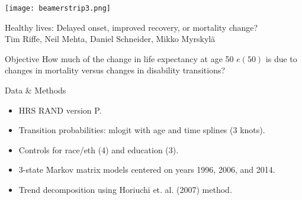 \documentclass[20pt,usenames,dvipsnames]{beamer}
\begin{document}

\begin{frame}[plain]
	\vspace{-3cm}
 \centerline{\texttt{[image: beamerstrip3.png]}}
	\huge
	\vspace{1em}
	
	Healthy lives: Delayed onset, improved recovery, or mortality
change?\\
	\vspace{1em}
	\large 
	Tim Riffe, Neil Mehta, Daniel Schneider, Mikko Myrskyl\"a 
\end{frame}
\begin{frame}[plain]
\Large
\begin{block}{Objective}
How much of the change in life expectancy at age 50 $e(50)$ is due to changes in mortality versus changes in disability transitions?
\end{block}
\end{frame}
\begin{frame}[plain]
\Large
\begin{block}{Data \& Methods}
\begin{itemize}
\item HRS RAND version P. 
\item Transition probabilities: mlogit with age and time splines (3 knots).
\item Controls for race/eth (4) and education (3). 
\item 3-state Markov matrix models centered on years 1996, 2006, and 2014. 
\item Trend decomposition using Horiuchi et. al. (2007) method.
\end{itemize}
\end{block}
\end{frame}

\begin{frame}[plain]
\Large
\begin{center}
\end{center}
\end{frame}
\end{document}
